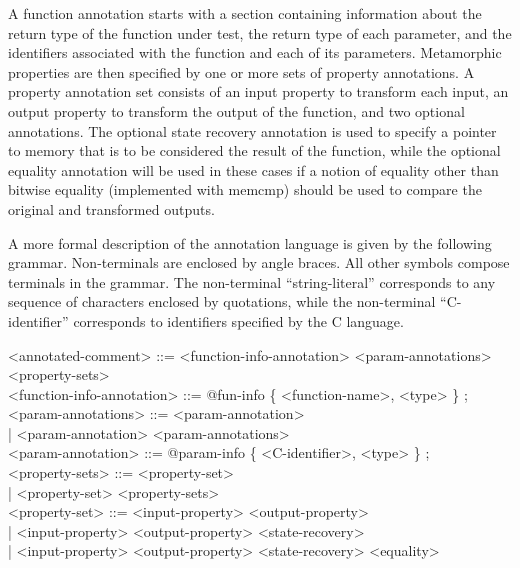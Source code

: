 \documentclass[notitlepage]{article}
\begin{document}
A function annotation starts with a section containing information about the return type of the function under test, the return type of each parameter, and the identifiers associated with the function and each of its parameters. Metamorphic properties are then specified by one or more sets of property annotations. A property annotation set consists of an input property to transform each input, an output property to transform the output of the function, and two optional annotations. The optional state recovery annotation is used to specify a pointer to memory that is to be considered the result of the function, while the optional equality annotation will be used in these cases if a notion of equality other than bitwise equality (implemented with memcmp) should be used to compare the original and transformed outputs.

A more formal description of the annotation language is given by the following grammar. Non-terminals are enclosed by angle braces. All other symbols compose terminals in the grammar. The non-terminal ``string-literal'' corresponds to any sequence of characters enclosed by quotations, while the non-terminal ``C-identifier'' corresponds to identifiers specified by the C language.

\ttfamily

<annotated-comment> ::= <function-info-annotation> <param-annotations> <property-sets> \\

<function-info-annotation> ::= @fun-info \{ <function-name>, <type> \} ; \\

<param-annotations> ::= <param-annotation> \\
\phantom{1}\hspace{105pt}| <param-annotation> <param-annotations> \\

<param-annotation> ::= @param-info \{ <C-identifier>, <type> \} ; \\

<property-sets> ::= <property-set> \\
\phantom{1}\hspace{85pt}| <property-set> <property-sets> \\

<property-set> ::= <input-property> <output-property> \\
\phantom{1}\hspace{82pt}| <input-property> <output-property> <state-recovery> \\
\phantom{1}\hspace{82pt}| <input-property> <output-property> <state-recovery> <equality> \\
\end{document}
